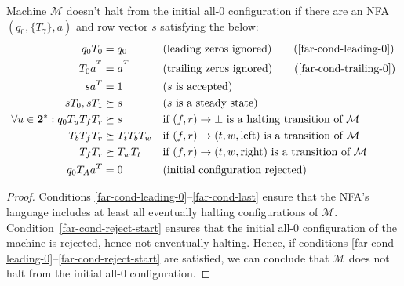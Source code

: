 \begin{theorem}\normalfont
  \label{far-main-theorem}
  Machine $\mathcal{M}$ doesn't halt from the initial all-0 configuration if there are an NFA $(q_0, \{T_\gamma\}, a)$ and row vector $s$ satisfying the below:
  \begin{align}
    \label{far-cond-first}
    q_0 T_0                                  & = q_0
                                             &                     & \text{(leading zeros ignored)}
    \tag{\ref{far-cond-leading-0}}
    \\
    T_0a^{\T}                                & = a^{\T}
                                             &                     & \text{(trailing zeros ignored)}
    \tag{\ref{far-cond-trailing-0}}
    \\
    sa\T                                     & = 1
                                             &                     & \text{($s$ is accepted)}
    \label{far-cond-ass-accepted}
    \\
    sT_0,sT_1                                & \succeq s
                                             &                     & \text{($s$ is a steady state)}
    \label{far-cond-ass-steady}
    \\
    \forall u\in\mathbf{2}^*: q_0T_u T_f T_r & \succeq s
                                             &                     & \text{if $(f,r) \to \bot$ is a halting transition of $\mathcal{M}$}
    \label{far-cond-halt}
    \\
    T_b T_f T_r                              & \succeq T_t T_b T_w
                                             &                     & \text{if $(f,r) \to (t,w,\text{left})$ is a transition of $\mathcal{M}$}
    \label{far-cond-left}
    \\
    T_f T_r                                  & \succeq T_w T_t
                                             &                     & \text{if $(f,r) \to (t,w,\text{right})$ is a transition of $\mathcal{M}$}
    \label{far-cond-last}
    \\
    q_0 T_A a\T                              & = 0
                                             &                     & \text{(initial configuration rejected)}
    \label{far-cond-reject-start}
  \end{align}
\end{theorem}
\begin{proof}
  Conditions \eqref{far-cond-leading-0}--\eqref{far-cond-last} ensure that the NFA's language includes at least all eventually halting configurations of $\mathcal{M}$. Condition~\eqref{far-cond-reject-start} ensures that the initial all-0 configuration of the machine is rejected, hence not enventually halting. Hence, if conditions \eqref{far-cond-leading-0}--\eqref{far-cond-reject-start} are satisfied, we can conclude that $\mathcal{M}$ does not halt from the initial all-0 configuration.
\end{proof}


